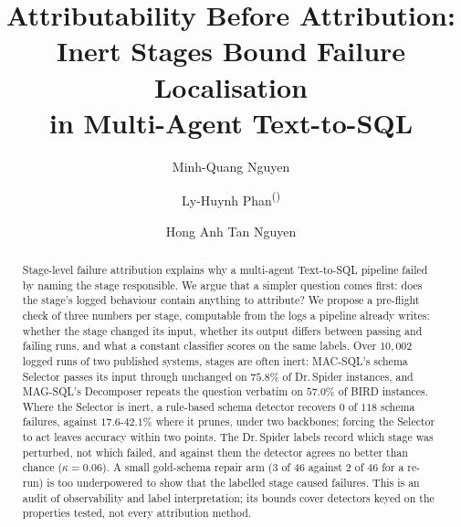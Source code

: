 \documentclass{llncs}
\begin{document}
\title{Attributability Before Attribution:\\
Inert Stages Bound Failure Localisation\\
in Multi-Agent Text-to-SQL}


\author{Minh-Quang Nguyen \and Ly-Huynh Phan\textsuperscript{(\Letter)} \and Hong Anh Tan Nguyen}


\maketitle

\begin{abstract}
Stage-level failure attribution explains why a multi-agent Text-to-SQL
pipeline failed by naming the stage responsible. We argue that a simpler
question comes first: does the stage's logged behaviour contain anything to
attribute? We propose a pre-flight check of three numbers per stage,
computable from the logs a pipeline already writes: whether the stage
changed its input, whether its output differs between passing and failing
runs, and what a constant classifier scores on the same labels. Over
$10{,}002$ logged runs of two published systems, stages are often inert: MAC-SQL's schema Selector passes its input through
unchanged on $75.8\%$ of Dr.\,Spider instances, and MAG-SQL's Decomposer
repeats the question verbatim on $57.0\%$ of BIRD instances. Where the
Selector is inert, a rule-based schema detector recovers $0$ of $118$ schema
failures, against $17.6$-$42.1\%$ where it prunes, under two backbones;
forcing the Selector to act leaves accuracy within two points. The
Dr.\,Spider labels record which stage was perturbed, not which failed, and
against them the detector agrees no better than chance ($\kappa = 0.06$).
A small gold-schema repair arm ($3$ of $46$ against $2$ of $46$ for a
re-run) is too underpowered to show that the labelled stage caused failures. This is an audit of observability and label interpretation; its
bounds cover detectors keyed on the properties tested, not every attribution
method.
\end{abstract}
\end{document}
